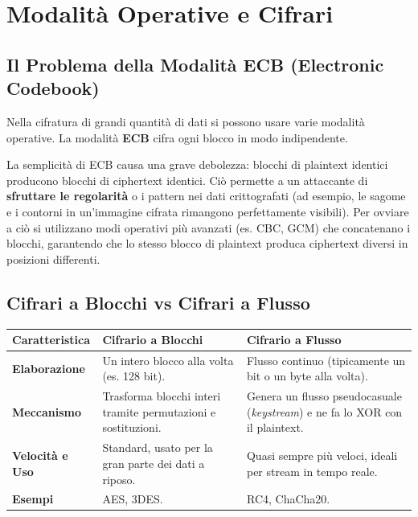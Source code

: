 \section{Modalità Operative e Cifrari}

\subsection{Il Problema della Modalità ECB (Electronic Codebook)}
Nella cifratura di grandi quantità di dati si possono usare varie modalità operative. La modalità \textbf{ECB} cifra ogni blocco in modo indipendente. 

\begin{warnbox}
La semplicità di ECB causa una grave debolezza: blocchi di plaintext identici producono blocchi di ciphertext identici. Ciò permette a un attaccante di \textbf{sfruttare le regolarità} o i pattern nei dati crittografati (ad esempio, le sagome e i contorni in un'immagine cifrata rimangono perfettamente visibili). Per ovviare a ciò si utilizzano modi operativi più avanzati (es. CBC, GCM) che concatenano i blocchi, garantendo che lo stesso blocco di plaintext produca ciphertext diversi in posizioni differenti.
\end{warnbox}

\subsection{Cifrari a Blocchi vs Cifrari a Flusso}
\begin{table}[H]
\centering
\begin{tabular}{|l|p{6cm}|p{6cm}|}
\hline
\textbf{Caratteristica} & \textbf{Cifrario a Blocchi} & \textbf{Cifrario a Flusso} \\ \hline
\textbf{Elaborazione} & Un intero blocco alla volta (es. 128 bit). & Flusso continuo (tipicamente un bit o un byte alla volta). \\ \hline
\textbf{Meccanismo} & Trasforma blocchi interi tramite permutazioni e sostituzioni. & Genera un flusso pseudocasuale (\textit{keystream}) e ne fa lo XOR con il plaintext. \\ \hline
\textbf{Velocità e Uso} & Standard, usato per la gran parte dei dati a riposo. & Quasi sempre più veloci, ideali per stream in tempo reale. \\ \hline
\textbf{Esempi} & AES, 3DES. & RC4, ChaCha20. \\ \hline
\end{tabular}
\end{table}

